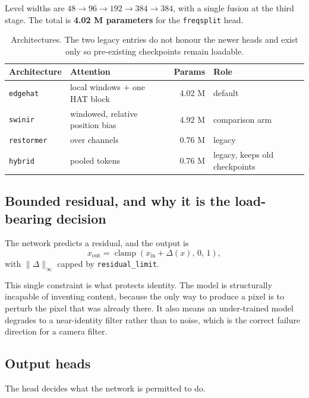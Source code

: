 \documentclass[11pt,a4paper]{article}
\newcommand{\code}[1]{\texttt{#1}}
\begin{document}
Level widths are $48 \rightarrow 96 \rightarrow 192 \rightarrow 384 \rightarrow 384$,
with a single fusion at the third stage. The total is \textbf{4.02 M parameters}
for the \code{freqsplit} head.

\begin{table}[h]
\centering
\begin{tabular}{@{}llrl@{}}
\toprule
Architecture & Attention & Params & Role \\
\midrule
\code{edgehat} & local windows $+$ one HAT block & 4.02 M & default \\
\code{swinir}  & windowed, relative position bias & 4.92 M & comparison arm \\
\code{restormer} & over channels & 0.76 M & legacy \\
\code{hybrid}  & pooled tokens & 0.76 M & legacy, keeps old checkpoints \\
\bottomrule
\end{tabular}
\caption{Architectures. The two legacy entries do not honour the newer heads and
exist only so pre-existing checkpoints remain loadable.}
\label{tab:archs}
\end{table}

\subsection{Bounded residual, and why it is the load-bearing decision}

The network predicts a residual, and the output is
\begin{equation}
  x_{\text{out}} = \operatorname{clamp}\!\left(x_{\text{in}} + \Delta(x),\, 0,\, 1\right),
\end{equation}
with $\lVert\Delta\rVert_\infty$ capped by \code{residual\_limit}.

This single constraint is what protects identity. The model is structurally
incapable of inventing content, because the only way to produce a pixel is to
perturb the pixel that was already there. It also means an under-trained model
degrades to a near-identity filter rather than to noise, which is the correct
failure direction for a camera filter.

\subsection{Output heads}

The head decides what the network is permitted to do.
\end{document}
